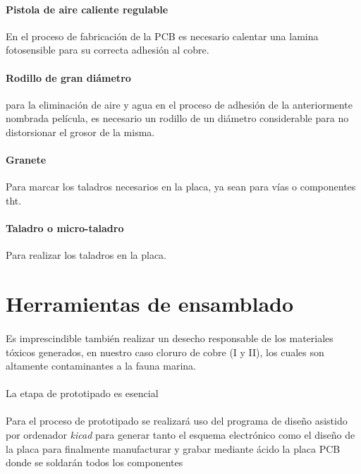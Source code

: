 \paragraph{Pistola de aire caliente regulable} En el proceso de fabricación de la PCB es necesario calentar una lamina fotosensible para su correcta adhesión al cobre.

\paragraph{Rodillo de gran diámetro} para la eliminación de aire y agua en el proceso de adhesión de la anteriormente nombrada película, es necesario un rodillo de un diámetro considerable para no distorsionar el grosor de la misma.

\paragraph{Granete} Para marcar los taladros necesarios en la placa, ya sean para vías o componentes tht.

\paragraph{Taladro o micro-taladro} Para realizar los taladros en la placa.

\section{Herramientas de ensamblado}
\paragraph{}


\paragraph{} Es imprescindible también realizar un desecho responsable de los materiales tóxicos generados, en nuestro caso cloruro de cobre (I y II), los cuales son altamente contaminantes a la fauna marina.

\paragraph{}
La etapa de prototipado es esencial

\paragraph{}
Para el proceso de prototipado se realizará uso del programa de diseño asistido por ordenador \textit{kicad} \cite{kicad} para generar tanto el esquema electrónico como el diseño de la placa para finalmente manufacturar y grabar mediante ácido la placa PCB donde se soldarán todos los componentes

